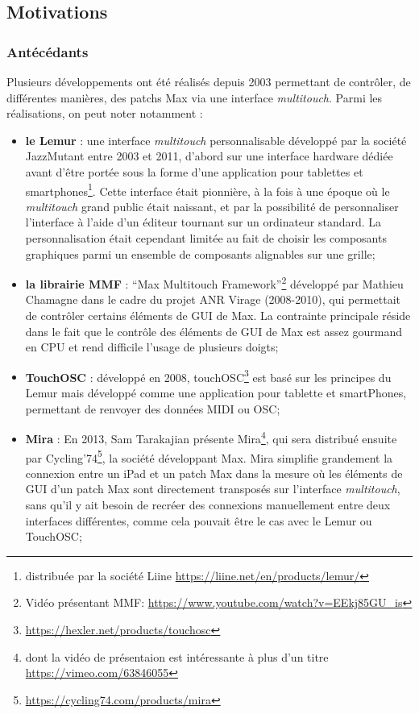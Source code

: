 \subsection{Motivations}

\subsubsection{Antécédants} 

\noindent Plusieurs développements ont été réalisés depuis 2003 permettant de contrôler, de différentes manières, des patchs Max via une interface \textit{multitouch}. Parmi les réalisations, on peut noter notamment :
\vspace{-1em}
\begin{itemize}[noitemsep]
	\item \textbf{le Lemur} : une interface \textit{multitouch} personnalisable développé par la société JazzMutant entre 2003 et 2011, d'abord sur une interface hardware dédiée avant d'être portée sous la forme d'une application pour tablettes et smartphones\footnote{distribuée par la société Liine \url{https://liine.net/en/products/lemur/}}. Cette interface était pionnière, à la fois à une époque où le \textit{multitouch} grand public était naissant, et par la possibilité de personnaliser l'interface à l'aide d'un éditeur tournant sur un ordinateur standard. La personnalisation était cependant limitée au fait de choisir les composants graphiques parmi un ensemble de composants alignables sur une grille;

	\item \textbf{la librairie MMF} : ``Max Multitouch Framework''\footnote{Vidéo présentant MMF: \url{https://www.youtube.com/watch?v=EEkj85GU_is}} développé par Mathieu Chamagne dans le cadre du projet \gls{ANR} Virage (2008-2010), qui permettait de contrôler certains éléments de \gls{GUI} de Max. La contrainte principale réside dans le fait que le contrôle des éléments de \gls{GUI} de Max est assez gourmand en \gls{CPU} et rend difficile l'usage de plusieurs doigts;

	\item \textbf{TouchOSC} : développé en 2008, touchOSC\footnote{\url{https://hexler.net/products/touchosc}} est basé sur les principes du Lemur mais développé comme une application pour tablette et smartPhones, permettant de renvoyer des données \gls{MIDI} ou \gls{OSC};

	\item \textbf{Mira} : En 2013, Sam Tarakajian présente Mira\footnote{dont la vidéo de présentaion est intéressante à plus d'un titre \url{https://vimeo.com/63846055}}, qui sera distribué ensuite par Cycling'74\footnote{\url{https://cycling74.com/products/mira}}, la société développant Max. Mira simplifie grandement la connexion entre un iPad et un patch Max dans la mesure où les éléments de \gls{GUI} d'un patch Max sont directement transposés sur l'interface \textit{multitouch}, sans qu'il y ait besoin de recréer des connexions manuellement entre deux interfaces différentes, comme cela pouvait être le cas avec le Lemur ou TouchOSC;


\end{itemize}
